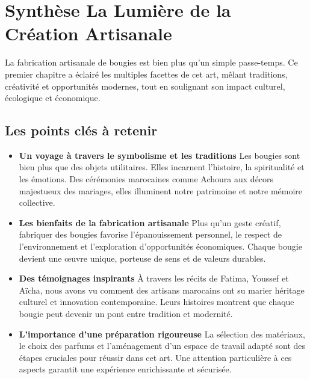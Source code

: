 \documentclass[11pt,fleqn,onecolumn,oneside]{book}
\begin{document}
\section{Synthèse La Lumière de la Création Artisanale}

\begin{definition}
La fabrication artisanale de bougies est bien plus qu’un simple passe-temps. Ce premier chapitre a éclairé les multiples facettes de cet art, mêlant traditions, créativité et opportunités modernes, tout en soulignant son impact culturel, écologique et économique.
\end{definition}

\subsection*{Les points clés à retenir}

\begin{itemize}
    \item \textbf{Un voyage à travers le symbolisme et les traditions} 
    Les bougies sont bien plus que des objets utilitaires. Elles incarnent l’histoire, la spiritualité et les émotions. Des cérémonies marocaines comme Achoura aux décors majestueux des mariages, elles illuminent notre patrimoine et notre mémoire collective.
    
    \item \textbf{Les bienfaits de la fabrication artisanale} 
    Plus qu’un geste créatif, fabriquer des bougies favorise l’épanouissement personnel, le respect de l’environnement et l’exploration d’opportunités économiques. Chaque bougie devient une œuvre unique, porteuse de sens et de valeurs durables.
    
    \item \textbf{Des témoignages inspirants} 
    À travers les récits de Fatima, Youssef et Aïcha, nous avons vu comment des artisans marocains ont su marier héritage culturel et innovation contemporaine. Leurs histoires montrent que chaque bougie peut devenir un pont entre tradition et modernité.
    
    \item \textbf{L’importance d’une préparation rigoureuse} 
    La sélection des matériaux, le choix des parfums et l’aménagement d’un espace de travail adapté sont des étapes cruciales pour réussir dans cet art. Une attention particulière à ces aspects garantit une expérience enrichissante et sécurisée.
\end{itemize}
\end{document}
